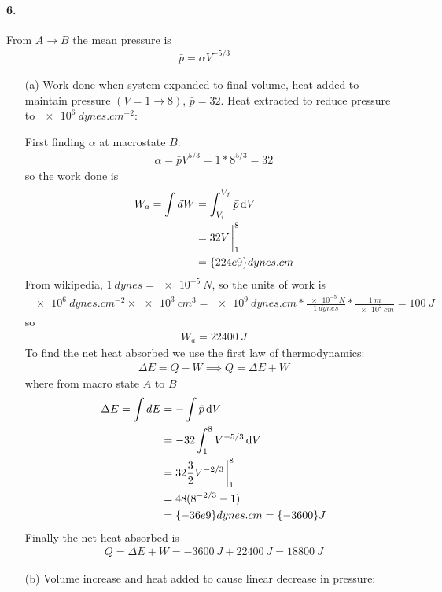 \documentclass[../main.tex]{subfiles}
\begin{document}
\paragraph{6.} From $A \to B$ the mean pressure is
\begin{align*}
    \bar p = \alpha V^{-5/3}
\end{align*}
\begin{itemize}
    \item [(a)] Work done when system expanded to final volume, heat added to maintain pressure $(V = 1 \to 8)$, $\bar p = 32$.
    Heat extracted to reduce pressure to $\qty{e6}{dynes.cm^{-2}}$:

    First finding $\alpha$ at macrostate $B$:
    \begin{align*}
        \alpha = \bar p V^{5/3} = 1 * 8^{5/3} = 32
    \end{align*}
    so the work done is
    \begin{align*}
        W_a = \int \dbar W &= \int_{V_i}^{V_f} \bar p \dd{V} \\
        &= 32 V \eval_1^8 \\
        &= \qty{224e9}{dynes.cm}
    \end{align*}
    From wikipedia, $\qty{1}{dynes} = \qty{e-5}{N}$, so the units of work is
    \begin{align*}
        \qty{e6}{dynes.cm^{-2}} \times \qty{e3}{cm^3} = \qty{e9}{dynes.cm} * \frac{\qty{e-5}{N}}{\qty{1}{dynes}} * \frac{\qty{1}{m}}{\qty{e2}{cm}}
        = \qty{100}{J}
    \end{align*}
    so
    \begin{align*}
        W_a = \qty{22400}{J}
    \end{align*}
    To find the net heat absorbed we use the first law of thermodynamics:
    \begin{align*}
        \Delta E = Q - W \implies Q = \Delta E + W
    \end{align*}
    where from macro state $A$ to $B$ 
    \begin{align*}
        \Delta E = \int dE &= -\int \bar p \dd{V} \\
        &= -32 \int_1^8 V^{-5/3} \dd{V} \\
        &= 32 \frac{3}{2} V^{-2/3} \eval_1^8 \\
        &= 48 (8^{-2/3} - 1) \\
        &= \qty{-36e9}{dynes.cm} = \qty{-3600}{J}
    \end{align*}
    Finally the net heat absorbed is
    \begin{align*}
        Q = \Delta E + W = \qty{-3600}{J} + \qty{22400}{J} = \qty{18800}{J}
    \end{align*}
    \item [(b)] Volume increase and heat added to cause linear decrease in pressure:


\end{itemize}
\end{document}
